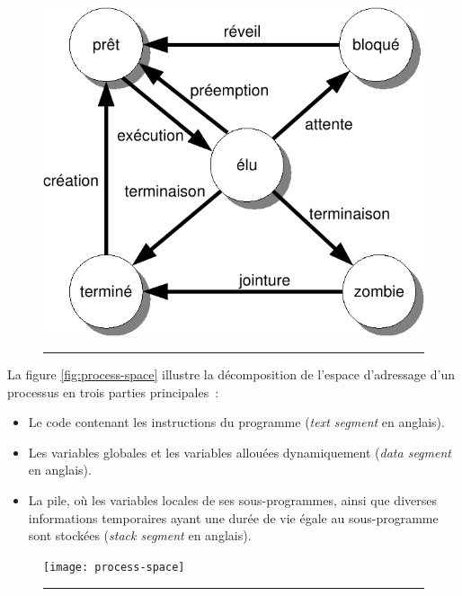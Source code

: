 \begin{figure}[ht]
\begin{center}
\includegraphics{images/process-state-unix}
\end{center}
\vspace{-.3cm}
\rule{\textwidth}{0.01in}
\end{figure}

La figure \ref{fig:process-space} illustre la décomposition de l'espace d'adressage d'un processus en trois parties principales~:
\begin{itemize}
\item Le code contenant les instructions du programme (\emph{text segment} en anglais).
\item Les variables globales et les variables allouées dynamiquement (\emph{data segment} en anglais).
\item La pile, où les variables locales de ses sous-programmes, ainsi que diverses informations temporaires ayant une durée de vie égale au sous-programme sont stockées (\emph{stack segment} en anglais).
\end{itemize}

\begin{figure}[ht]
\begin{center}
\texttt{[image: process-space]}
\end{center}
\vspace{-.3cm}
\rule{\textwidth}{0.01in}
\end{figure}


